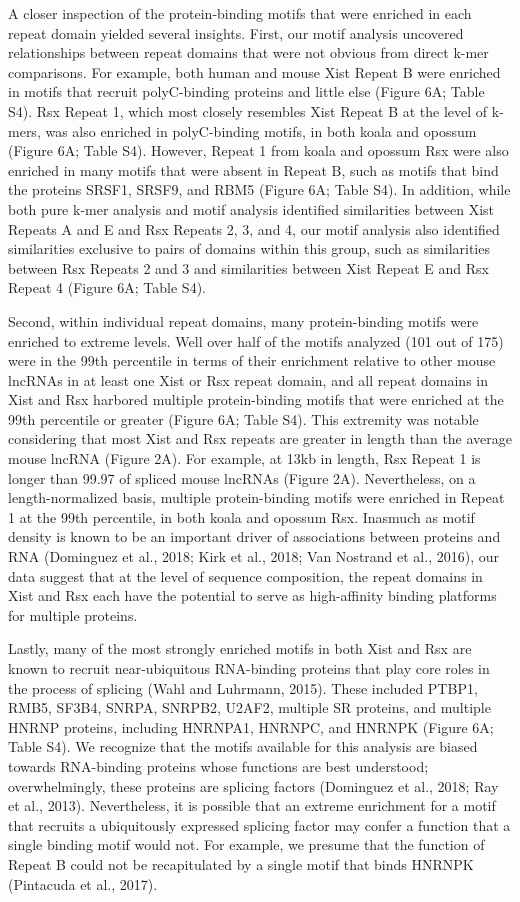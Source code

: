 A closer inspection of the protein-binding motifs that were enriched in each repeat domain yielded several insights. First, our motif analysis uncovered relationships between repeat domains that were not obvious from direct k-mer comparisons. For example, both human and mouse Xist Repeat B were enriched in motifs that recruit polyC-binding proteins and little else (Figure 6A; Table S4). Rsx Repeat 1, which most closely resembles Xist Repeat B at the level of k-mers, was also enriched in polyC-binding motifs, in both koala and opossum (Figure 6A; Table S4). However, Repeat 1 from koala and opossum Rsx were also enriched in many motifs that were absent in Repeat B, such as motifs that bind the proteins SRSF1, SRSF9, and RBM5 (Figure 6A; Table S4). In addition, while both pure k-mer analysis and motif analysis identified similarities between Xist Repeats A and E and Rsx Repeats 2, 3, and 4, our motif analysis also identified similarities exclusive to pairs of domains within this group, such as similarities between Rsx Repeats 2 and 3 and similarities between Xist Repeat E and Rsx Repeat 4 (Figure 6A; Table S4). 

Second, within individual repeat domains, many protein-binding motifs were enriched to extreme levels. Well over half of the motifs analyzed (101 out of 175) were in the 99th percentile in terms of their enrichment relative to other mouse lncRNAs in at least one Xist or Rsx repeat domain, and all repeat domains in Xist and Rsx harbored multiple protein-binding motifs that were enriched at the 99th percentile or greater (Figure 6A; Table S4). This extremity was notable considering that most Xist and Rsx repeats are greater in length than the average mouse lncRNA (Figure 2A). For example, at 13kb in length, Rsx Repeat 1 is longer than 99.97 of spliced mouse lncRNAs (Figure 2A). Nevertheless, on a length-normalized basis, multiple protein-binding motifs were enriched in Repeat 1 at the 99th percentile, in both koala and opossum Rsx. Inasmuch as motif density is known to be an important driver of associations between proteins and RNA (Dominguez et al., 2018; Kirk et al., 2018; Van Nostrand et al., 2016), our data suggest that at the level of sequence composition, the repeat domains in Xist and Rsx each have the potential to serve as high-affinity binding platforms for multiple proteins.

Lastly, many of the most strongly enriched motifs in both Xist and Rsx are known to recruit near-ubiquitous RNA-binding proteins that play core roles in the process of splicing (Wahl and Luhrmann, 2015). These included PTBP1, RMB5, SF3B4, SNRPA, SNRPB2, U2AF2, multiple SR proteins, and multiple HNRNP proteins, including HNRNPA1, HNRNPC, and HNRNPK (Figure 6A; Table S4). We recognize that the motifs available for this analysis are biased towards RNA-binding proteins whose functions are best understood; overwhelmingly, these proteins are splicing factors (Dominguez et al., 2018; Ray et al., 2013). Nevertheless, it is possible that an extreme enrichment for a motif that recruits a ubiquitously expressed splicing factor may confer a function that a single binding motif would not. For example, we presume that the function of Repeat B could not be recapitulated by a single motif that binds HNRNPK (Pintacuda et al., 2017). 


